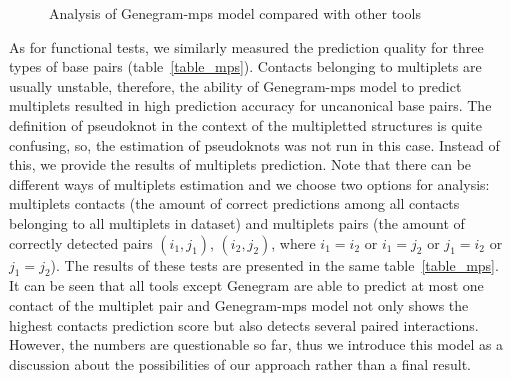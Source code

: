 \begin{figure}
\centering
    \hfill
    \par 
\caption{Analysis of Genegram-mps model compared with other tools }
\label{plots_pks}
\end{figure} 

As for functional tests, we similarly measured the prediction quality for three types of base pairs (table~\ref{table_mps}). Contacts belonging to multiplets are usually unstable, therefore, the ability of Genegram-mps model to predict multiplets resulted in high prediction accuracy for uncanonical base pairs. The definition of pseudoknot in the context of the multipletted structures is quite confusing, so, the estimation of pseudoknots was not run in this case. Instead of this, we provide the results of multiplets prediction. Note that there can be different ways of multiplets estimation and we choose two options for analysis: multiplets contacts (the amount of correct predictions among all contacts belonging to all multiplets in dataset) and multiplets pairs (the amount of correctly detected pairs $(i_1, j_1)$, $(i_2, j_2)$, where $i_1 = i_2$ or $i_1 = j_2$ or $j_1 = i_2$ or $j_1 = j_2$). The results of these tests are presented in the same table~\ref{table_mps}. It can be seen that all tools except Genegram are able to predict at most one contact of the multiplet pair and Genegram-mps model not only shows the highest contacts prediction score but also detects several paired interactions. However, the numbers are questionable so far, thus we introduce this model as a discussion about the possibilities of our approach rather than a final result.

